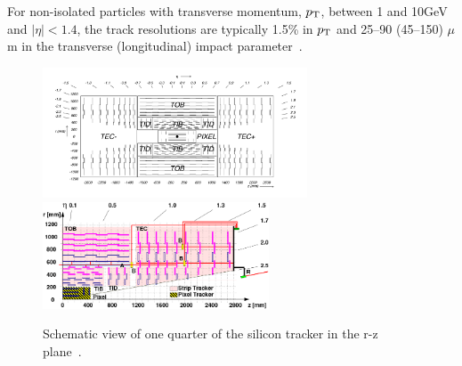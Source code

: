 For non-isolated particles with transverse momentum, $p_{\mathrm{T}}$, between 1 and 10GeV and $|\eta|<1.4$, the track resolutions are typically 1.5\% in $p_{\mathrm{T}}$ and 25–90 (45–150) $\mu$m in the transverse (longitudinal) impact parameter~\cite{TRK-11-001}.

\begin{figure}[!ht]
  \begin{center}
  \includegraphics[width=0.7\textwidth]{Fig/CMS_Detector/TrakerLayout}\\
    \includegraphics[width=0.6\textwidth]{Fig/CMS_Detector/figs_TrackerLayoutWithLAS}\\
    \caption{Schematic view of one quarter of the silicon tracker in the r-z plane~\cite{Chatrchyan:2008aa}.\label{fig:TrkerLayout}}
  \end{center}
\end{figure}

